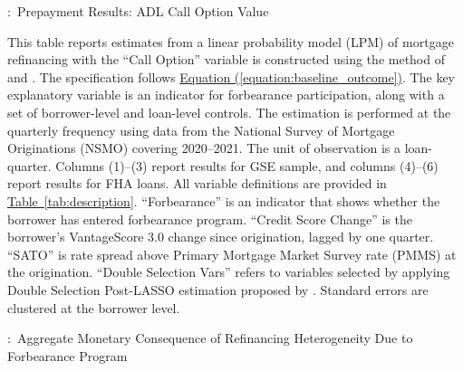 \documentclass[11pt]{article}
\begin{document}
{\begin{table}[htbp]
\captionsetup{justification=justified,singlelinecheck=false}
\footnotesize
\caption{:\ Prepayment Results: ADL Call Option Value}
\label{tab:adl_dynamic}
\vspace{0.5em}

\begin{minipage}{\textwidth}
\small
This table reports estimates from a linear probability model (LPM) of mortgage refinancing with the ``Call Option'' variable is constructed using the method of \citet{agarwal2013optimal} and \citet{berger2024optimal}. The specification follows \hyperref[equation:baseline_outcome]{Equation (\ref*{equation:baseline_outcome})}. The key explanatory variable is an indicator for forbearance participation, along with a set of borrower-level and loan-level controls. The estimation is performed at the quarterly frequency using data from the National Survey of Mortgage Originations (NSMO) covering 2020–2021. The unit of observation is a loan-quarter. Columns (1)–(3) report results for GSE sample, and columns (4)–(6) report results for FHA loans. All variable definitions are provided in \hyperref[tab:description]{Table~\ref*{tab:description}}. ``Forbearance'' is an indicator that shows whether the borrower has entered forbearance program. ``Credit Score Change'' is the borrower’s VantageScore 3.0 change since origination, lagged by one quarter. ``SATO'' is rate spread above Primary Mortgage Market Survey rate (PMMS) at the origination. ``Double Selection Vars'' refers to variables selected by applying Double Selection Post-LASSO estimation proposed by \citet{belloni2014inference}.    Standard errors are clustered at the borrower level. 

\end{minipage}

\vspace{1em}




\end{table}
\FloatBarrier
\clearpage






\begin{table}[htbp]
\captionsetup{justification=justified,singlelinecheck=false}
\footnotesize
\caption{:\ Aggregate Monetary Consequence of Refinancing Heterogeneity Due to Forbearance Program}
\label{tab:aggregate_saving}

\vspace{0.5em}


\end{table}}
\end{document}
